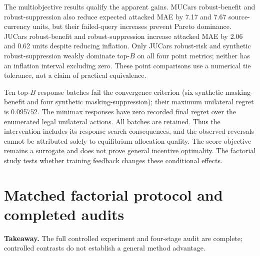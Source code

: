 \documentclass[11pt]{article}
\begin{document}
The multiobjective results qualify the apparent gains. MUCars robust-benefit
and robust-suppression also reduce expected attacked MAE by 7.17 and 7.67
source-currency units, but their failed-query increases prevent Pareto
dominance. JUCars robust-benefit and robust-suppression increase attacked MAE
by 2.06 and 0.62 units despite reducing inflation. Only JUCars robust-risk and
synthetic robust-suppression weakly dominate top-$B$ on all four point metrics;
neither has an inflation interval excluding zero. These point comparisons use
a numerical tie tolerance, not a claim of practical equivalence.

Ten top-$B$ response batches fail the convergence criterion (six synthetic
masking-benefit and four synthetic masking-suppression); their maximum
unilateral regret is 0.095752. The minimax responses have zero recorded final
regret over the enumerated legal unilateral actions. All batches are retained.
Thus the intervention includes its response-search consequences, and the
observed reversals cannot be attributed solely to equilibrium allocation quality.
The score objective remains a surrogate and does not prove general incentive
optimality. The factorial study tests whether training feedback changes these
conditional effects.

\section{Matched factorial protocol and completed audits}
\noindent\textbf{Takeaway.} The full controlled experiment and four-stage audit are complete;
controlled contrasts do not establish a general method advantage.
\end{document}
